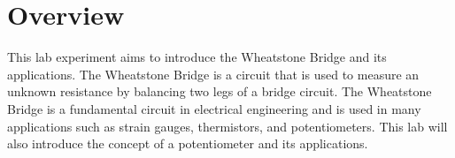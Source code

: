 \chapter{Overview}

This lab experiment aims to introduce the Wheatstone Bridge and its applications. The
Wheatstone Bridge is a circuit that is used to measure an unknown resistance by balancing
two legs of a bridge circuit. The Wheatstone Bridge is a fundamental circuit in electrical
engineering and is used in many applications such as strain gauges, thermistors, and
potentiometers. This lab will also introduce the concept of a potentiometer and its
applications.
